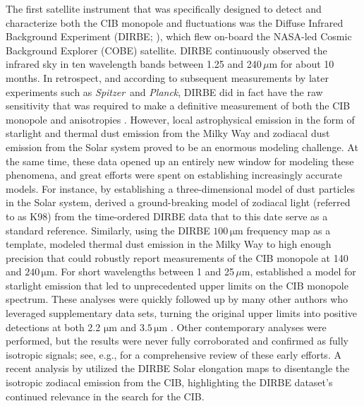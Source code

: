 \documentclass{aa}
\def\Planck{\textit{Planck}}
\def\Spitzer{\textit{Spitzer}}
\begin{document}
The first satellite instrument that was specifically designed to detect and characterize both the CIB monopole and fluctuations was the Diffuse Infrared Background Experiment (DIRBE; \citealp{hauser1998}), which flew on-board the NASA-led Cosmic Background Explorer (COBE) satellite. DIRBE continuously observed the infrared sky in ten wavelength bands between 1.25 and 240\,$\mu\mathrm{m}$ for about 10 months. In retrospect, and according to subsequent measurements by later experiments such as \Spitzer\ and \Planck, DIRBE did in fact have the raw sensitivity that was required to make a definitive measurement of both the CIB monopole and anisotropies \citep{boggess92,hauser1998}. However, local astrophysical emission in the form of starlight and thermal dust emission from the Milky Way and zodiacal dust emission from the Solar system proved to be an enormous modeling challenge. At the same time, these data opened up an entirely new window for modeling these phenomena, and great efforts were spent on establishing increasingly accurate models. For instance, by establishing a three-dimensional model of dust particles in the Solar system, \citet{kelsall1998} derived a ground-breaking model of zodiacal light (referred to as K98) from the time-ordered DIRBE data that to this date serve as a standard reference. Similarly, using the DIRBE $100\,\mathrm{\mu m}$ frequency map as a template, \citet{arendt1998} modeled thermal dust emission in the Milky Way to high enough precision that \citet{hauser1998} could robustly report measurements of the CIB monopole at 140 and $240\,\mathrm{\mu m}$. For short wavelengths between 1 and 25$\,\mu\mathrm{m}$, \citet{arendt1998} established a model for starlight emission that led to unprecedented upper limits on the CIB monopole spectrum. These analyses were quickly followed up by many other authors who leveraged supplementary data sets, turning the original upper limits into positive detections at both 2.2 $\mathrm{\mu m}$ \citep{wright:2000,gorjian:2000,wright:2001} and $3.5\,\mathrm{\mu m}$ \citep{dwek:1998b,gorjian:2000,wright:2000}. Other contemporary analyses were performed, but the results were never fully corroborated and confirmed as fully isotropic signals; see, e.g., \citet{hauser:2001} for a comprehensive review of these early efforts. A recent analysis by \citet{sano:2020} utilized the DIRBE Solar elongation maps to disentangle the isotropic zodiacal emission from the CIB, highlighting the DIRBE dataset's continued relevance in the search for the CIB.
\end{document}
